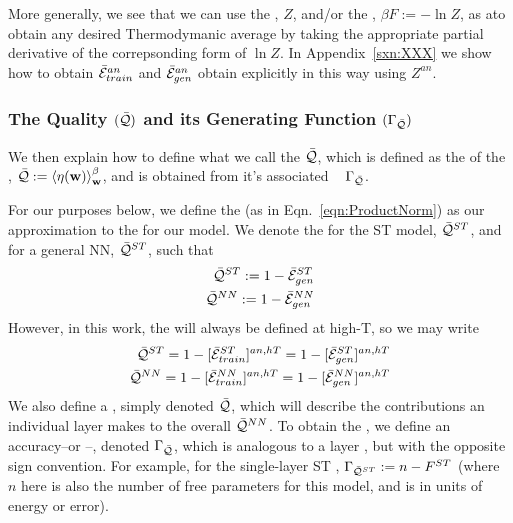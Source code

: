 More generally, we see that we can use the \PartitionFunction, $Z$,
and/or the \FreeEnergy, $\beta F:=-\ln Z$, as a\GeneratingFunction to obtain any
desired Thermodymanic average by taking the appropriate partial derivative
of the correpsonding form of $\ln Z$.
In Appendix~\ref{sxn:XXX} we show how to obtain 
$\bar{\mathcal{E}}_{train}^{an}$ and $\bar{\mathcal{E}}_{gen}^{an}$ obtain explicitly in this way using $Z^{an}$.


\subsubsection{The Quality $(\bar{\mathcal{Q}})$ and its Generating Function $(\Gamma_{\bar{\mathcal{Q}}})$}
We then explain how to define what we call the \Quality $\bar{\mathcal{Q}}$, which is
defined as the \ThermalAverage of the \SelfOverlap,  $\bar{\mathcal{Q}}:=\left\langle \eta({\mathbf{w}}) \right\rangle_{\mathbf w}^{\beta}$,
and is obtained from it's associated \emph{\Quality~\GeneratingFunction} $\Gamma_{\bar{\mathcal{Q}}}$.

For our purposes below, we define the \ModelQuality (as in Eqn.~\ref{eqn:ProductNorm}) as our approximation to the
\AverageGeneralizationAccuracy for our model. 
We denote the \ModelQuality for the ST \Perceptron model, $\bar{\mathcal{Q}}^{ST}$,
and for a general NN, $\bar{\mathcal{Q}}^{ST}$, such that
\begin{align}
  \label{eqn:model_pre_qualities}
\bar{\mathcal{Q}}^{ST}:=1-\bar{\mathcal{E}}_{gen}^{ST}  \\ 
\bar{\mathcal{Q}}^{NN}:=1-\bar{\mathcal{E}}_{gen}^{NN}  
\end{align}
However, in this work, the \Quality will always be defined at high-T, so we may write
\begin{align}
  \label{eqn:model_qualities}
  \bar{\mathcal{Q}}^{ST}=1-[\bar{\mathcal{E}}_{train}^{ST}]^{an,hT}=1-[\bar{\mathcal{E}}_{gen}^{ST}]^{an,hT} \\
  \bar{\mathcal{Q}}^{NN}=1-[\bar{\mathcal{E}}_{train}^{NN}]^{an,hT}=1-[\bar{\mathcal{E}}_{gen}^{NN}]^{an,hT} \\
\end{align}
We also define a \LayerQuality, simply denoted $\bar{\mathcal{Q}}$,
which will describe the contributions an individual layer makes to the overall \ModelQuality $\bar{\mathcal{Q}}^{NN}$.
To obtain the \LayerQuality, we define an accuracy--or \Quality--\GeneratingFunction, denoted $\Gamma_{\bar{\mathcal{Q}}}$, which
is analogous to a layer \FreeEnergy, but with the opposite sign convention.
For example, for the single-layer ST \Perceptron, $\Gamma_{\bar{\mathcal{Q}}^{ST}}:=n-F^{ST}$
(where $n$ here is also the number of free parameters for this model, and is in units of energy or error).

